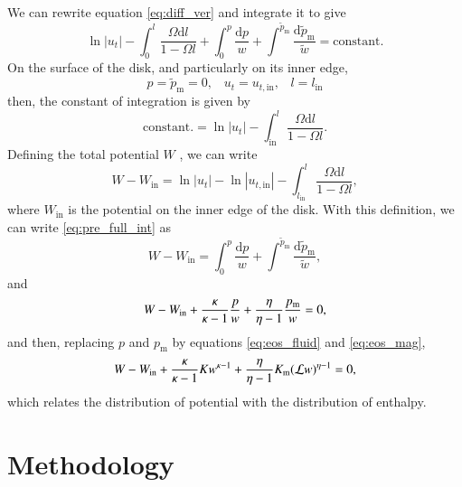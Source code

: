 \documentclass{aa}
\begin{document}
We can rewrite equation \eqref{eq:diff_ver} and integrate it to give
\begin{equation}\label{eq:pre_full_int}
\ln |u_t| - \int^l_0 \frac{\Omega \mathrm{d}l}{1 - \Omega l} + \int^p_0 \frac{\mathrm{d}p}{w} + \int^{\tilde{p}_{\mathrm{m}}} \frac{\mathrm{d}\tilde{p}_{\mathrm{m}}}{\tilde{w}} = \mathrm{constant}.
\end{equation}
On the surface of the disk, and particularly on its inner edge,
\begin{equation}
p = \tilde{p}_{\mathrm{m}} = 0, \;\;\; u_t = u_{t, \mathrm{in}}, \;\;\; l = l_{\mathrm{in}}
\end{equation}
then, the constant of integration is given by
\begin{equation}
\mathrm{constant.} = \ln |u_t| - \int^l_{\mathrm{in}} \frac{\Omega \mathrm{d}l}{1 - \Omega l}.
\end{equation}
Defining the total potential $W$ \citet{Abramowicz:1978}, we can write
\begin{equation}\label{eq:potential}
W - W_{\mathrm{in}} = \ln|u_t| - \ln|u_{t,\mathrm{in}}| - \int^{l}_{l_{\mathrm{in}}} \frac{\Omega \mathrm{d}l}{1 - \Omega l},
\end{equation}
where $W_{\mathrm{in}}$ is the potential on the inner edge of the disk. With this definition, we can write \eqref{eq:pre_full_int} as
\begin{equation}\label{eq:full_int}
W - W_{\mathrm{in}} = \int^p_0 \frac{\mathrm{d}p}{w} + \int^{\tilde{p}_{\mathrm{m}}} \frac{\mathrm{d}\tilde{p}_{\mathrm{m}}}{\tilde{w}},
\end{equation}
and
\begin{equation}\label{eq:pre_enthalpy_eq}
W - W_{\rm{in}} + \frac{\kappa}{\kappa - 1}\frac{p}{w} + \frac{\eta}{\eta - 1}\frac{p_{\mathrm{m}}}{w} = 0,
\end{equation}
and then, replacing $p$ and $p_{\mathrm{m}}$ by equations \eqref{eq:eos_fluid} and \eqref{eq:eos_mag},
\begin{equation}\label{eq:enthalpy_eq}
W - W_{\rm{in}} + \frac{\kappa}{\kappa - 1} K w^{\kappa - 1} + \frac{\eta}{\eta - 1}K_{\mathrm{m}}(\mathcal{L} w)^{\eta - 1} = 0,
\end{equation}
which relates the distribution of potential with the distribution of enthalpy.

\section{Methodology}
\end{document}
